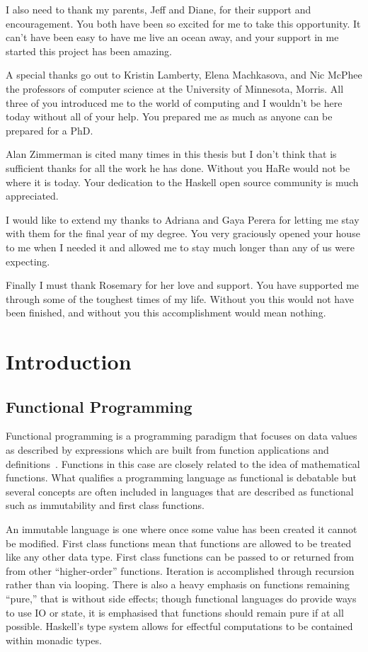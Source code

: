 \begin{preface}
I also need to thank my parents, Jeff and Diane, for their support and encouragement. You both have been so excited for me to take this opportunity. It can't have been easy to have me live an ocean away, and your support in me started this project has been amazing.

A special thanks go out to Kristin Lamberty, Elena Machkasova, and Nic McPhee the professors of computer science at the University of Minnesota, Morris. All three of you introduced me to the world of computing and I wouldn't be here today without all of your help. You prepared me as much as anyone can be prepared for a PhD.

Alan Zimmerman is cited many times in this thesis but I don't think that is sufficient thanks for all the work he has done. Without you HaRe would not be where it is today. Your dedication to the Haskell open source community is much appreciated.

I would like to extend my thanks to Adriana and Gaya Perera for letting me stay with them for the final year of my degree. You very graciously opened your house to me when I needed it and allowed me to stay much longer than any of us were expecting.

Finally I must thank Rosemary for her love and support. You have supported me through some of the toughest times of my life. Without you this would not have been finished, and without you this accomplishment would mean nothing.

\end{preface}

\chapter{Introduction}\label{chp:intro}


\section{Functional Programming}
Functional programming is a programming paradigm that focuses on data values as described by expressions which are built from function applications and definitions~\citep{elementsOfFunc}.  Functions in this case are closely related to the idea of mathematical functions. What qualifies a programming language as functional is debatable but several concepts are often included in languages that are described as functional such as immutability and first class functions.

An immutable language is one where once some value has been created it cannot be modified. First class functions mean that functions are allowed to be treated like any other data type. First class functions can be passed to or returned from from other ``higher-order'' functions. Iteration is accomplished through recursion rather than via looping. There is also a heavy emphasis on functions remaining ``pure,'' that is without side effects; though functional languages do provide ways to use IO or state, it is emphasised that functions should remain pure if at all possible. Haskell's type system allows for effectful computations to be contained within monadic types.
  
